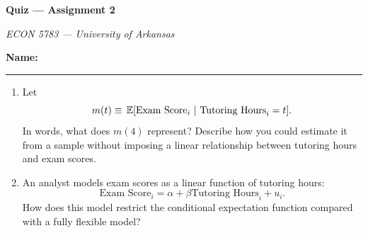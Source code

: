 \documentclass[12pt]{article}
\begin{document}
\begin{center}
  {\Huge\bf Quiz --- Assignment 2}

  \smallskip
  {\large\it ECON 5783 --- University of Arkansas}
\end{center}

\vspace{5mm}
\noindent\textbf{Name:} \rule{0.7\textwidth}{0.4pt}

\bigskip
\begin{enumerate}
  \item Let
  $$
    m(t) \equiv \expec{\text{Exam Score}_i}{\text{Tutoring Hours}_i = t}.
  $$
  In words, what does $m(4)$ represent?
  Describe how you could estimate it from a sample without imposing a linear relationship between tutoring hours and exam scores.

  
  \vspace*{10\bigskipamount}
  \item An analyst models exam scores as a linear function of tutoring hours:
  $$
    \text{Exam Score}_i = \alpha + \beta \text{Tutoring Hours}_i + u_i.
  $$
  How does this model restrict the conditional expectation function compared with a fully flexible model?

  
\end{enumerate}
\end{document}
